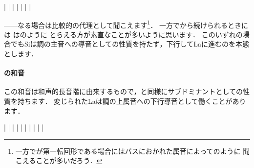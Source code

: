 \documentclass[dvipdfmx,uplatex,b5paper,openany,jbase=12Q,nomag*,textwidth-limit=44%
               ]{gachimuchi}[2020/05/05]
\begin{document}
\begin{floatMusic}[pos=ht]
  \Startpiece%
  \znotes|\en
  \NOTes
  |%
  \en\bar
  \NOTes
  \Mryaku\sk%
  |\Mryaku\sk%
  \en\doublebar
  \NOTes
  |%
  \en\bar
  \NOTes
  \Mryaku\sk%
  |\Mryaku\sk%
  \en\setdoublebar
  \endpiece%
\end{floatMusic}

------なる場合は比較的の代理として聞こえます\footnote{
  一方で\Gniii\Min が第一転回形である場合にはバスにおかれた属音によってのように
  聞こえることが多いだろう．
}．
一方でから続けられるときには
\Gniii\Min はのように
とらえる方が素直なことが多いように思います．
このいずれの場合でもSiは調の主音への導音としての性質を持たず，下行してLaに進むのを本態とします．


\paragraph{\Gniv\Min の和音}
この和音は和声的長音階に由来するもので，\Gniv と同様にサブドミナントとしての性質を持ちます．
変じられたLa\aFlat は調の上属音への下行導音として働くことがあります．

\begin{floatMusic}[pos=ht]
  \Startpiece%
  \znotes|\en
  \NOTes
  |%
  \en\bar
  \NOTEs
  |%
  \en\doublebar
  \NOTEs
  |%
  \en\bar
  \NOTEs
  |%
  \en\doublebar
  \NOTes
  \zchordsl{\Mdline}\sk%
  |%
  \en\bar
  \NOTes
  \Mryaku\sk%
  |%
  \Mryaku\sk
  \en\setdoublebar
  \endpiece%
\end{floatMusic}
\end{document}
